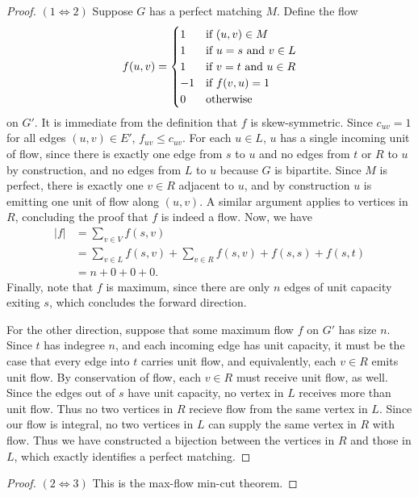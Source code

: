 \documentclass[11pt]{article}
\begin{document}
\begin{proof}
  \noindent $(1 \iff 2)$ Suppose $G$ has a perfect matching $M$.
  Define the flow \[f(u, v) = \begin{cases}
    1 & \textnormal{if $(u,v) \in M$}\\
    1 & \textnormal{if $u = s$ and $v \in L$}\\
    1 & \textnormal{if $v = t$ and $u \in R$}\\
    -1 & \textnormal{if $f(v, u) = 1$}\\
    0 & \textnormal{otherwise} \end{cases}\] on $G'$.
  It is immediate from the definition that $f$ is skew-symmetric.
  Since $c_{uv} = 1$ for all edges $(u, v) \in E'$, $f_{uv} \leq c_{uv}$.
  For each $u \in L$, $u$ has a single incoming unit of flow, since there is exactly one edge from $s$ to $u$ and no edges from $t$ or $R$ to $u$ by construction, and no edges from $L$ to $u$ because $G$ is bipartite.
  Since $M$ is perfect, there is exactly one $v \in R$ adjacent to $u$, and by construction $u$ is emitting one unit of flow along $(u, v)$.
  A similar argument applies to vertices in $R$, concluding the proof that $f$ is indeed a flow.
  Now, we have \begin{align*}
    |f| &= \sum_{v \in V} f(s, v)\\
    &= \sum_{v \in L} f(s, v) + \sum_{v \in R} f(s,v) + f(s, s) + f(s, t)\\
    &= n + 0 + 0 + 0.
  \end{align*}
  Finally, note that $f$ is maximum, since there are only $n$ edges of unit capacity exiting $s$, which concludes the forward direction.

  For the other direction, suppose that some maximum flow $f$ on $G'$ has size $n$.
  Since $t$ has indegree $n$, and each incoming edge has unit capacity, it must be the case that every edge into $t$ carries unit flow, and equivalently, each $v \in R$ emits unit flow.
  By conservation of flow, each $v \in R$ must receive unit flow, as well.
  Since the edges out of $s$ have unit capacity, no vertex in $L$ receives more than unit flow.
  Thus no two vertices in $R$ recieve flow from the same vertex in $L$.
  Since our flow is integral, no two vertices in $L$ can supply the same vertex in $R$ with flow.
  Thus we have constructed a bijection between the vertices in $R$ and those in $L$, which exactly identifies a perfect matching.
\end{proof}

\begin{proof}
  $(2 \iff 3)$ This is the max-flow min-cut theorem.
\end{proof}
\end{document}
